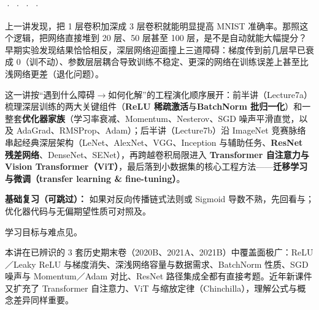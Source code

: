 



 ·  ·  ·  · 

上一讲发现，把 1 层卷积加深成 3 层卷积就能明显提高 MNIST 准确率。那照这个逻辑，把网络直接堆到 20 层、50 层甚至 100 层，是不是自动就能大幅提分？早期实验发现结果恰恰相反，深层网络迎面撞上三道障碍：梯度传到前几层早已衰成 0（训不动）、参数层层耦合导致训练不稳定、更深的网络在训练误差上甚至比浅网络更差（退化问题）。

这一讲按“遇到什么障碍\ensuremath{\to}如何化解”的工程演化顺序展开：前半讲（Lecture7a）梳理深层训练的两大关键组件（\textbf{ReLU 稀疏激活}与\textbf{BatchNorm 批归一化}）和一整套\textbf{优化器家族}（学习率衰减、Momentum、Nesterov、SGD 噪声平滑直觉，以及 AdaGrad、RMSProp、Adam）；后半讲（Lecture7b）沿 ImageNet 竞赛脉络串起经典深层架构（LeNet、AlexNet、VGG、Inception 与辅助任务、\textbf{ResNet 残差网络}、DenseNet、SENet），再跨越卷积局限进入 \textbf{Transformer 自注意力与 Vision Transformer（ViT）}，最后落到小数据集的核心工程方法——\textbf{迁移学习与微调（transfer learning \& fine-tuning）}。

\textbf{基础复习（可跳过）：} 如果对反向传播链式法则或 Sigmoid 导数不熟，先回看与；优化器代码与无偏期望性质可对照及。

学习目标与难点见。



本讲在已辨识的 3 套历史期末卷（2020B、2021A、2021B）中覆盖面极广：ReLU／Leaky ReLU 与梯度消失、深浅网络容量与数据需求、BatchNorm 性质、SGD 噪声与 Momentum／Adam 对比、ResNet 路径集成全都有直接考题。近年新课件又扩充了 Transformer 自注意力、ViT 与缩放定律（Chinchilla），理解公式与概念差异同样重要。

